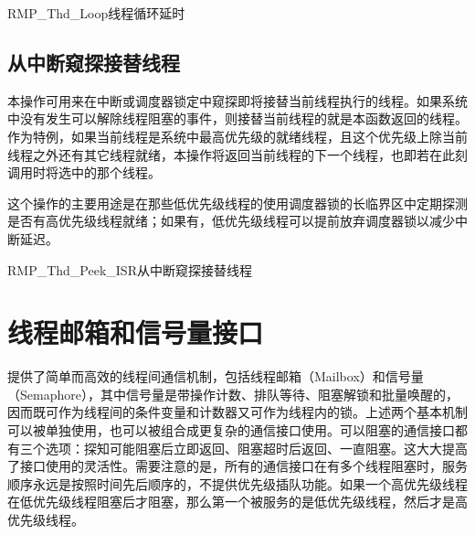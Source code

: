 \begin{apidesc}{RMP\_Thd\_Loop}{线程循环延时}
    \begin{apiparams}
    \end{apiparams}
    \begin{apiret}
    \end{apiret}
\end{apidesc}

\subsection{从中断窥探接替线程}\label{subsec:peek-at-the-next-thread-from-an-isr}

本操作可用来在中断或调度器锁定中窥探即将接替当前线程执行的线程。如果系统中没有发生可以解除线程阻塞的事件，则接替当前线程的就是本函数返回的线程。作为特例，如果当前线程是系统中最高优先级的就绪线程，且这个优先级上除当前线程之外还有其它线程就绪，本操作将返回当前线程的下一个线程，也即若在此刻调用时将选中的那个线程。

这个操作的主要用途是在那些低优先级线程的使用调度器锁的长临界区中定期探测是否有高优先级线程就绪；如果有，低优先级线程可以提前放弃调度器锁以减少中断延迟。

\begin{apidesc}{RMP\_Thd\_Peek\_ISR}{从中断窥探接替线程}
    \begin{apiparams}
    \end{apiparams}
    \begin{apiret}
    \end{apiret}
\end{apidesc}

\section{线程邮箱和信号量接口}\label{sec:thread-mailbox-and-semaphore-interface}

提供了简单而高效的线程间通信机制，包括线程邮箱（Mailbox）和信号量（Semaphore），其中信号量是带操作计数、排队等待、阻塞解锁和批量唤醒的，因而既可作为线程间的条件变量和计数器又可作为线程内的锁。上述两个基本机制可以被单独使用，也可以被组合成更复杂的通信接口使用。可以阻塞的通信接口都有三个选项：探知可能阻塞后立即返回、阻塞超时后返回、一直阻塞。这大大提高了接口使用的灵活性。需要注意的是，所有的通信接口在有多个线程阻塞时，服务顺序永远是按照时间先后顺序的，不提供优先级插队功能。如果一个高优先级线程在低优先级线程阻塞后才阻塞，那么第一个被服务的是低优先级线程，然后才是高优先级线程。

